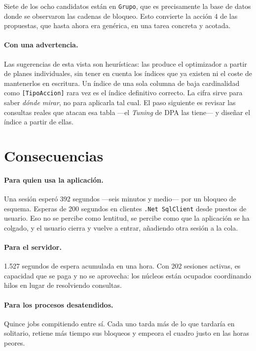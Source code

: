 \documentclass[11pt,a4paper]{article}
\newcommand{\cod}[1]{\texttt{\small #1}}
\begin{document}
Siete de los ocho candidatos están en \cod{Grupo}, que es precisamente la base
de datos donde se observaron las cadenas de bloqueo. Esto convierte la acción
4 de las propuestas, que hasta ahora era genérica, en una tarea concreta y
acotada.

\paragraph{Con una advertencia.} Las sugerencias de esta vista son
heurísticas: las produce el optimizador a partir de planes individuales, sin
tener en cuenta los índices que ya existen ni el coste de mantenerlos en
escritura. Un índice de una sola columna de baja cardinalidad como
\cod{[TipoAccion]} rara vez es el índice definitivo correcto. La cifra sirve
para saber \emph{dónde mirar}, no para aplicarla tal cual. El paso siguiente
es revisar las consultas reales que atacan esa tabla —el \emph{Tuning} de DPA
las tiene— y diseñar el índice a partir de ellas.

\newpage
\section{Consecuencias}

\paragraph{Para quien usa la aplicación.} Una sesión esperó 392 segundos
—seis minutos y medio— por un bloqueo de esquema. Esperas de 200 segundos
en clientes \cod{.Net SqlClient} desde puestos de usuario. Eso no se percibe
como lentitud, se percibe como que la aplicación se ha colgado, y el usuario
cierra y vuelve a entrar, añadiendo otra sesión a la cola.

\paragraph{Para el servidor.} 1.527 segundos de espera acumulada en una
hora. Con 202 sesiones activas, es capacidad que se paga y no se aprovecha:
los núcleos están ocupados coordinando hilos en lugar de resolviendo
consultas.

\paragraph{Para los procesos desatendidos.} Quince jobs compitiendo entre
sí. Cada uno tarda más de lo que tardaría en solitario, retiene más tiempo
sus bloqueos y empeora el cuadro justo en las horas peores.
\end{document}
